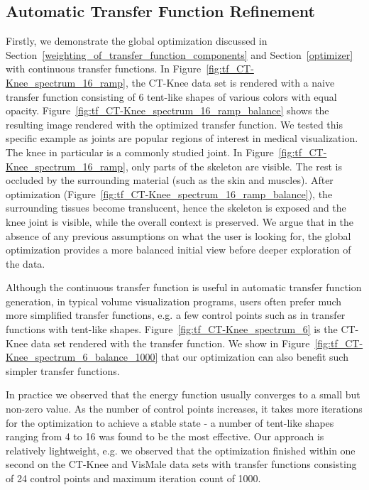 \subsection{Automatic Transfer Function Refinement \label{automatic_transfer_function_refinement}}
Firstly, we demonstrate the global optimization discussed in Section~\ref{weighting_of_transfer_function_components} and Section~\ref{optimizer} with continuous transfer functions.
In Figure~\ref{fig:tf_CT-Knee_spectrum_16_ramp}, the CT-Knee data set is rendered with a naive transfer function consisting of 6 tent-like shapes of various colors with equal opacity. Figure~\ref{fig:tf_CT-Knee_spectrum_16_ramp_balance} shows the resulting image rendered with the optimized transfer function.
We tested this specific example as joints are popular regions of interest in medical visualization.
The knee in particular is a commonly studied joint.
In Figure~\ref{fig:tf_CT-Knee_spectrum_16_ramp}, only parts of the skeleton are visible. The rest is occluded by the surrounding material (such as the skin and muscles).
After optimization (Figure~\ref{fig:tf_CT-Knee_spectrum_16_ramp_balance}), the surrounding tissues become translucent, hence the skeleton is exposed and the knee joint is visible, while the overall context is preserved. We argue that in the absence of any previous assumptions on what the user is looking for, the global optimization provides a more balanced initial view before deeper exploration of the data.

Although the continuous transfer function is useful in automatic transfer function generation, in typical volume visualization programs, users often prefer much more simplified transfer functions, e.g. a few control points such as in transfer functions with tent-like shapes. Figure~\ref{fig:tf_CT-Knee_spectrum_6} is the CT-Knee data set rendered with the transfer function. We show in Figure~\ref{fig:tf_CT-Knee_spectrum_6_balance_1000} that our optimization can also benefit such simpler transfer functions.

In practice we observed that the energy function usually converges to a small but non-zero value. As the number of control points increases, it takes more iterations for the optimization to achieve a stable state - a number of tent-like shapes ranging from 4 to 16 was found to be the most effective.
Our approach is relatively lightweight, e.g. we observed that the optimization finished within one second on the CT-Knee and VisMale data sets with transfer functions consisting of 24 control points and maximum iteration count of 1000.

